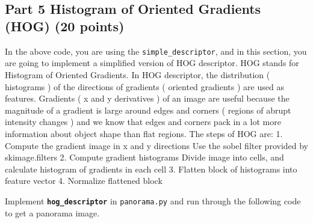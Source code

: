 \documentclass[11pt]{article}
\begin{document}
    \begin{center}
    \end{center}
    { \hspace*{\fill} \\}
    
    \begin{center}
    \end{center}
    { \hspace*{\fill} \\}
    
    \subsection{Part 5 Histogram of Oriented Gradients (HOG) (20
points)}\label{part-5-histogram-of-oriented-gradients-hog-20-points}

In the above code, you are using the \texttt{simple\_descriptor}, and in
this section, you are going to implement a simplified version of HOG
descriptor. HOG stands for Histogram of Oriented Gradients. In HOG
descriptor, the distribution ( histograms ) of the directions of
gradients ( oriented gradients ) are used as features. Gradients ( x and
y derivatives ) of an image are useful because the magnitude of a
gradient is large around edges and corners ( regions of abrupt intensity
changes ) and we know that edges and corners pack in a lot more
information about object shape than flat regions. The steps of HOG are:
1. Compute the gradient image in x and y directions Use the sobel filter
provided by skimage.filters 2. Compute gradient histograms Divide image
into cells, and calculate histogram of gradients in each cell 3. Flatten
block of histograms into feature vector 4. Normalize flattened block

Implement \textbf{\texttt{hog\_descriptor}} in \texttt{panorama.py} and
run through the following code to get a panorama image.
\end{document}
